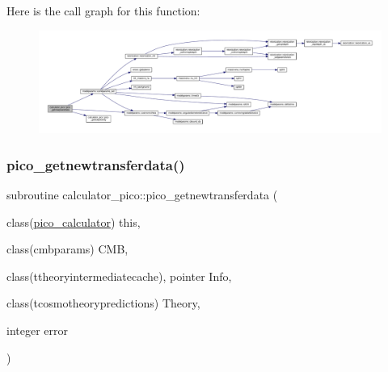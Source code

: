 Here is the call graph for this function\+:
\nopagebreak
\begin{figure}[H]
\begin{center}
\leavevmode
\includegraphics[width=350pt]{namespacecalculator__pico_a45cf2dcc102d6d731b105dcc2b985c04_cgraph}
\end{center}
\end{figure}
\mbox{\label{namespacecalculator__pico_a76b2c99179137a67bf5deffecbe7a883}} 
\subsubsection{\texorpdfstring{pico\+\_\+getnewtransferdata()}{pico\_getnewtransferdata()}}
{\footnotesize\ttfamily subroutine calculator\+\_\+pico\+::pico\+\_\+getnewtransferdata (\begin{DoxyParamCaption}\item[{class(\mbox{\hyperlink{structcalculator__pico_1_1pico__calculator}{pico\+\_\+calculator}})}]{this,  }\item[{class(cmbparams)}]{C\+MB,  }\item[{class(ttheoryintermediatecache), pointer}]{Info,  }\item[{class(tcosmotheorypredictions)}]{Theory,  }\item[{integer}]{error }\end{DoxyParamCaption})\hspace{0.3cm}{\ttfamily [private]}}

\mbox{\label{namespacecalculator__pico_adaa7c5af46424e51b4ff7c68520348c2}} 

